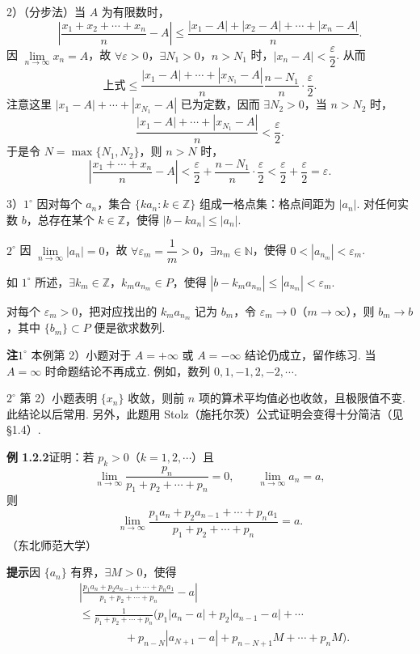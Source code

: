\documentclass[UTF8,12pt,a4paper,fontset=fandol]{ctexart}
\begin{document}
2）（分步法）当 $A$ 为有限数时，
\[
  \left|\frac{x_1+x_2+\cdots+x_n}{n}-A\right|
  \le\frac{|x_1-A|+|x_2-A|+\cdots+|x_n-A|}{n}.
\]
因 $\lim\limits_{n\to\infty}x_n=A$，故 $\forall\varepsilon>0$，$\exists N_1>0$，$n>N_1$ 时，$|x_n-A|<\dfrac\varepsilon2$. 从而
\[
\text{上式}\le
\frac{|x_1-A|+\cdots+|x_{N_1}-A|}{n}
\frac{n-N_1}{n}\cdot\frac\varepsilon2.
\]
注意这里 $|x_1-A|+\cdots+|x_{N_1}-A|$ 已为定数，因而 $\exists N_2>0$，当 $n>N_2$ 时，
\[
  \frac{|x_1-A|+\cdots+|x_{N_1}-A|}{n}<\frac\varepsilon2.
\]
于是令 $N=\max\{N_1,N_2\}$，则 $n>N$ 时，
\[
  \left|\frac{x_1+\cdots+x_n}{n}-A\right|
  <\frac\varepsilon2+\frac{n-N_1}{n}\cdot\frac\varepsilon2<\frac\varepsilon2+\frac\varepsilon2=\varepsilon.
\]

3）$1^\circ$ 因对每个 $a_n$，集合 $\{ka_n:k\in\mathbb{Z}\}$ 组成一格点集：格点间距为 $|a_n|$. 对任何实数 $b$，总存在某个 $k\in\mathbb{Z}$，使得 $|b-ka_n|\le |a_n|$.

$2^\circ$ 因 $\lim\limits_{n\to\infty}|a_n|=0$，故 $\forall\varepsilon_m=\dfrac1m>0$，$\exists n_m\in\mathbb{N}$，使得 $0<|a_{n_m}|<\varepsilon_m$.

如 $1^\circ$ 所述，$\exists k_m\in\mathbb{Z}$，$k_ma_{n_m}\in P$，使得 $|b-k_ma_{n_m}|\le |a_{n_m}|<\varepsilon_m$.

对每个 $\varepsilon_m>0$，把对应找出的 $k_ma_{n_m}$ 记为 $b_m$，令 $\varepsilon_m\to0$（$m\to\infty$），则 $b_m\to b$，其中 $\{b_m\}\subset P$ 便是欲求数列.

\noindent\textbf{注}\quad $1^\circ$ 本例第 2）小题对于 $A=+\infty$ 或 $A=-\infty$ 结论仍成立，留作练习. 当 $A=\infty$ 时命题结论不再成立. 例如，数列 $0,1,-1,2,-2,\cdots$.

$2^\circ$ 第 2）小题表明 $\{x_n\}$ 收敛，则前 $n$ 项的算术平均值必也收敛，且极限值不变. 此结论以后常用. 另外，此题用 Stolz（施托尔茨）公式证明会变得十分简洁（见 §1.4）.

\noindent\textbf{例 1.2.2}\quad 证明：若 $p_k>0$（$k=1,2,\cdots$）且
\[
  \lim_{n\to\infty}\frac{p_n}{p_1+p_2+\cdots+p_n}=0,\qquad
  \lim_{n\to\infty}a_n=a,
\]
则
\[
  \lim_{n\to\infty}\frac{p_1a_n+p_2a_{n-1}+\cdots+p_na_1}{p_1+p_2+\cdots+p_n}=a.
\]
（东北师范大学）

\noindent\textbf{提示}\quad 因 $\{a_n\}$ 有界，$\exists M>0$，使得
\[
\begin{aligned}
&\left|\frac{p_1a_n+p_2a_{n-1}+\cdots+p_na_1}{p_1+p_2+\cdots+p_n}-a\right|\\
&\le \frac1{p_1+p_2+\cdots+p_n}
\bigl(p_1|a_n-a|+p_2|a_{n-1}-a|+\cdots\\
&\qquad\qquad +p_{n-N}|a_{N+1}-a|+p_{n-N+1}M+\cdots+p_nM\bigr).
\end{aligned}
\]
\end{document}
